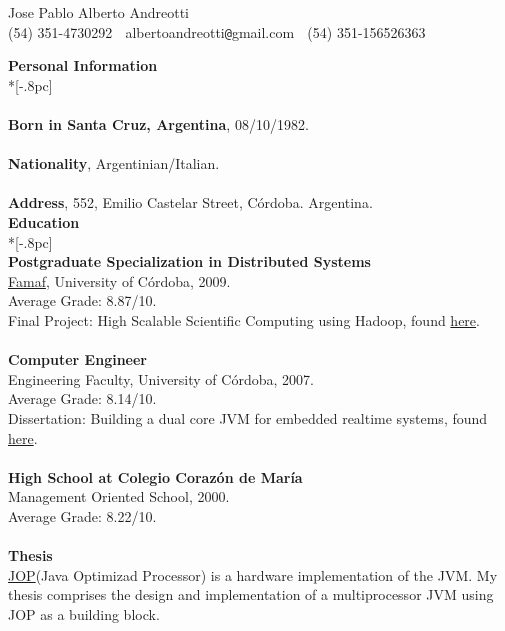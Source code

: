 \documentclass[a4paper,11pt,english]{article}
\begin{document}
\begin{center}
{\Large Jose Pablo Alberto Andreotti} \\[.5pc]
(54) 351-4730292 $\;$ albertoandreotti\verb|@|gmail.com $\;$ (54) 351-156526363 \\[3pc]
\end{center}
{\large \bf Personal Information} \\*[-.8pc]
\underline{\hspace{6in}} \\
\\
{\bf Born in Santa Cruz, Argentina}, 08/10/1982.\\
\\
{\bf Nationality}, Argentinian/Italian.\\
\\
{\bf Address}, 552, Emilio Castelar Street, C\'ordoba. Argentina.\\

{\large \bf Education} \\*[-.8pc]
\underline{\hspace{6in}} \\
\newline
{\bf Postgraduate Specialization in Distributed Systems}\\
\href{http://www.famaf.unc.edu.ar/}{Famaf}, University of C\'ordoba, 2009. \\
Average Grade: 8.87/10. \\
Final Project: High Scalable Scientific Computing using Hadoop, found \href{https://docs.google.com/viewer?a=v&pid=explorer&chrome=true&srcid=0B5AOpwg8IzVANjJlODZhZDctNWUzMS00MmNhLWI3OWMtMWNhMTdjODQwNjVl&hl=en}{here}.\\
\\
{\bf Computer Engineer}\\
Engineering Faculty, University of C\'ordoba, 2007.\\
Average Grade: 8.14/10. \\
Dissertation: Building a dual core JVM for embedded realtime systems, found \href{https://docs.google.com/viewer?a=v&pid=explorer&chrome=true&srcid=1gdJXYgQtLDHDOxGDtbKzdmAl1LmNx-yo4w6vNl-K_Z-1YocLhtJxMvoqGvd1&hl=en}{here}.\\
\\
{\bf High School at Colegio Coraz\'on de Mar\'ia}\\
Management Oriented School, 2000.\\
Average Grade: 8.22/10.\\
\\
{\bf Thesis} \\
\href{http://www.jopdesign.com}{JOP}(Java Optimizad Processor) is a hardware implementation of the JVM. My thesis 
comprises the design and implementation of a multiprocessor JVM using JOP as a building block.\\
\end{document}
